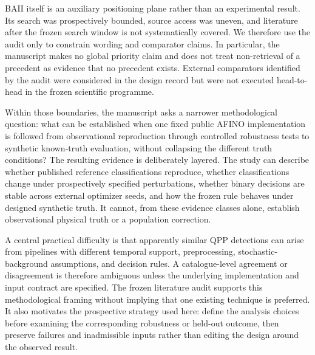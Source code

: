 \documentclass[11pt,a4paper]{article}
\begin{document}
BAII itself is an auxiliary positioning plane rather than an experimental result. Its search was prospectively bounded, source access was uneven, and literature after the frozen search window is not systematically covered. We therefore use the audit only to constrain wording and comparator claims. In particular, the manuscript makes no global priority claim and does not treat non-retrieval of a precedent as evidence that no precedent exists. External comparators identified by the audit were considered in the design record but were not executed head-to-head in the frozen scientific programme.

Within those boundaries, the manuscript asks a narrower methodological question: what can be established when one fixed public AFINO implementation is followed from observational reproduction through controlled robustness tests to synthetic known-truth evaluation, without collapsing the different truth conditions? The resulting evidence is deliberately layered. The study can describe whether published reference classifications reproduce, whether classifications change under prospectively specified perturbations, whether binary decisions are stable across external optimizer seeds, and how the frozen rule behaves under designed synthetic truth. It cannot, from these evidence classes alone, establish observational physical truth or a population correction.

A central practical difficulty is that apparently similar QPP detections can arise from pipelines with different temporal support, preprocessing, stochastic-background assumptions, and decision rules. A catalogue-level agreement or disagreement is therefore ambiguous unless the underlying implementation and input contract are specified. The frozen literature audit supports this methodological framing without implying that one existing technique is preferred. It also motivates the prospective strategy used here: define the analysis choices before examining the corresponding robustness or held-out outcome, then preserve failures and inadmissible inputs rather than editing the design around the observed result.
\end{document}
